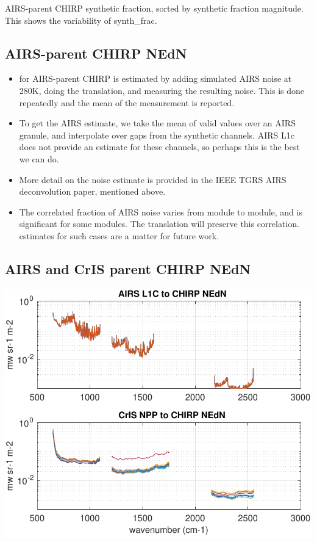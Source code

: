 \documentclass[12pt]{article}
\begin{document}
AIRS-parent CHIRP synthetic fraction, sorted by synthetic
fraction magnitude.  This shows the variability of synth\_frac.

\subsection{AIRS-parent CHIRP NEdN}

\begin{itemize}

  \item {\nedn} for AIRS-parent CHIRP is estimated by adding
    simulated AIRS noise at 280K, doing the translation, and
    measuring the resulting noise.  This is done repeatedly and the
    mean of the measurement is reported.

  \item To get the AIRS estimate, we take the mean of valid
    {\nedn} values over an AIRS granule, and interpolate over
    gaps from the synthetic channels.  AIRS L1c does not provide
    an {\nedn} estimate for these channels, so perhaps this is the
    best we can do.

  \item More detail on the noise estimate is provided in the IEEE TGRS
    AIRS deconvolution paper, mentioned above.

  \item The correlated fraction of AIRS noise varies from module
    to module, and is significant for some modules.  The translation
    will preserve this correlation.  {\nedn} estimates for such
    cases are a matter for future work.

\end{itemize}

\subsection{AIRS and CrIS parent CHIRP NEdN}

  \begin{centering}
  \includegraphics[width=\textwidth]{figures/chirp_nedn_from_airs_and_cris.pdf}
  \end{centering}\vspace{3mm}
\end{document}
